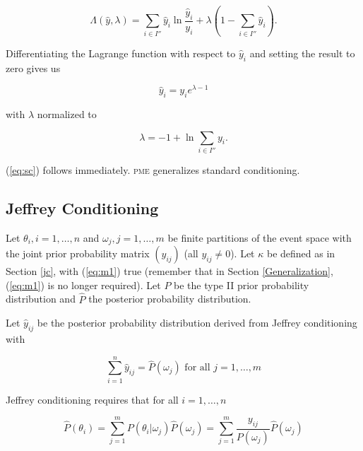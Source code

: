 \documentclass[entropy,article,accept,oneauthor,pdftex,12pt,a4paper]{mdpi}
\begin{document}
\begin{equation}
  \label{eq:sclag}
  \Lambda(\hat{y},\lambda)=\sum_{i\in{}I''}\hat{y}_{i}\ln\frac{\hat{y}_{i}}{y_{i}}+\lambda\left(1-\sum_{i\in{}I''}\hat{y}_{i}\right).
\end{equation}

{\noindent}Differentiating the Lagrange function with respect to $\hat{y}_{i}$ and
setting the result to zero gives us

\begin{equation}
  \label{eq:sc1}
  \hat{y}_{i}=y_{i}e^{\lambda-1}
\end{equation}

{\noindent}with $\lambda$ normalized to

\begin{equation}
  \label{eq:sc2}
  \lambda=-1+\ln{}\sum_{i\in{}I''}y_{i}.
\end{equation}

{\noindent}(\ref{eq:sc}) follows immediately. \textsc{pme} generalizes standard conditioning.

\subsection{Jeffrey Conditioning}
\label{jco}

Let $\theta_{i},i=1,\ldots,n$ and $\omega_{j},j=1,\ldots,m$ be finite
partitions of the event space with the joint prior probability matrix
$(y_{ij})$ (all $y_{ij}\neq{}0$). Let $\kappa$ be defined as in
Section \ref{jc}, with (\ref{eq:m1}) true (remember that in Section
\ref{Generalization}, (\ref{eq:m1}) is no longer required). Let $P$ be
the type II prior probability distribution and $\hat{P}$ the posterior
probability distribution.

Let $\hat{y}_{ij}$ be the posterior probability distribution derived
from Jeffrey conditioning with

\begin{equation}
  \label{eq:jc1}
  \sum_{i=1}^{n}\hat{y}_{ij}=\hat{P}(\omega_{j})\mbox{ for all }j=1,\ldots,m
\end{equation}

{\noindent}Jeffrey conditioning requires that for all $i=1,\ldots,n$

\begin{equation}
  \label{eq:jc2}
  \hat{P}(\theta_{i})=\sum_{j=1}^{m}P(\theta_{i}|\omega_{j})\hat{P}(\omega_{j})=\sum_{j=1}^{m}\frac{y_{ij}}{P(\omega_{j})}\hat{P}(\omega_{j})
\end{equation}
\end{document}
